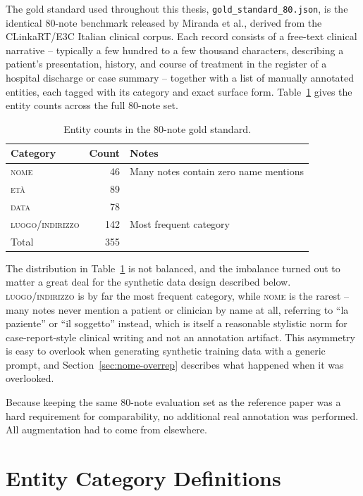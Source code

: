 \documentclass[12pt,a4paper]{report}
\newcommand{\NOME}{\textsc{nome}}
\newcommand{\ETA}{\textsc{et\`a}}
\newcommand{\DATA}{\textsc{data}}
\newcommand{\LUOGO}{\textsc{luogo\slash indirizzo}}
\begin{document}
The gold standard used throughout this thesis, \texttt{gold\_standard\_80.json}, is the identical 80-note benchmark released by Miranda et al., derived from the CLinkaRT/E3C Italian clinical corpus. Each record consists of a free-text clinical narrative -- typically a few hundred to a few thousand characters, describing a patient's presentation, history, and course of treatment in the register of a hospital discharge or case summary -- together with a list of manually annotated entities, each tagged with its category and exact surface form. Table~\ref{tab:entity-counts} gives the entity counts across the full 80-note set.

\begin{table}[htbp]
\centering
\caption{Entity counts in the 80-note gold standard.}
\label{tab:entity-counts}
\begin{tabular}{lrl}
\toprule
Category & Count & Notes \\
\midrule
\NOME{} & 46 & Many notes contain zero name mentions \\
\ETA{} & 89 & \\
\DATA{} & 78 & \\
\LUOGO{} & 142 & Most frequent category \\
\midrule
Total & 355 & \\
\bottomrule
\end{tabular}
\end{table}

The distribution in Table~\ref{tab:entity-counts} is not balanced, and the imbalance turned out to matter a great deal for the synthetic data design described below. \LUOGO{} is by far the most frequent category, while \NOME{} is the rarest -- many notes never mention a patient or clinician by name at all, referring to ``la paziente'' or ``il soggetto'' instead, which is itself a reasonable stylistic norm for case-report-style clinical writing and not an annotation artifact. This asymmetry is easy to overlook when generating synthetic training data with a generic prompt, and Section~\ref{sec:nome-overrep} describes what happened when it was overlooked.

Because keeping the same 80-note evaluation set as the reference paper was a hard requirement for comparability, no additional real annotation was performed. All augmentation had to come from elsewhere.

\section{Entity Category Definitions}
\end{document}
